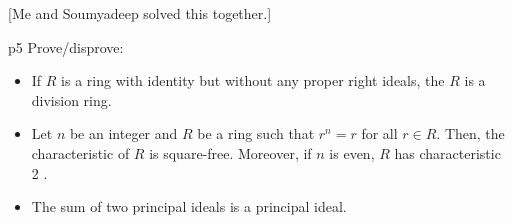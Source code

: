 \documentclass[a4paper, 11pt]{article}
\newcounter{problem}
\begin{document}
[Me and Soumyadeep solved this together.]\parinn	



\begin{problem}{%
}{p5%
}
Prove/disprove:
\begin{itemize}[label=$\bullet$]
	\item If $R$ is a ring with identity but without any proper right ideals, the $R$ is a division ring.
\item Let $n$ be an integer and $R$ be a ring such that $r^n=r$ for all $r \in R$. Then, the characteristic of $R$ is square-free. Moreover, if $n$ is even, $R$ has characteristic 2 .
\item The sum of two principal ideals is a principal ideal.
\end{itemize}
\end{problem}
\end{document}

